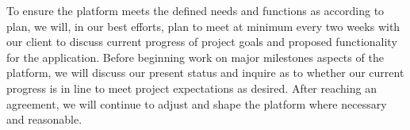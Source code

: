 \documentclass{article}
\begin{document}
To ensure the platform meets the defined needs and functions as according to plan, 
we will, in our best efforts, plan to meet at minimum every two weeks with our client to 
discuss current progress of project goals and proposed functionality for the application. 
Before beginning work on major milestones aspects of the platform, we will discuss our present 
status and inquire as to whether our current progress is in line to meet project expectations as
desired. After reaching an agreement, we will continue to adjust and shape the platform where 
necessary and reasonable.
\end{document}
